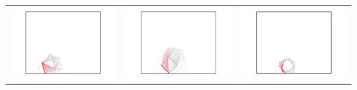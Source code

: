 \documentclass[11pt]{article}
\begin{document}
\begin{center}
\begin{tabular}{ccc}
\includegraphics[scale = 0.26]{simA_06.pdf} & \includegraphics[scale = 0.26]{simB_06.pdf} & \includegraphics[scale = 0.26]{simC_06.pdf} \\
\end{tabular}
\end{center}
\end{document}
